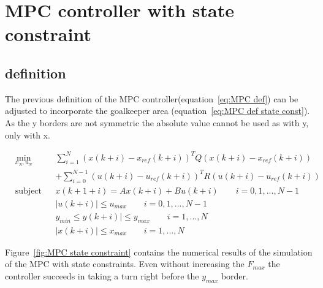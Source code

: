 \section{MPC controller with state constraint}
	\subsection{definition}
	The previous definition of the MPC controller(equation~\ref{eq:MPC def}) can be adjusted to incorporate the goalkeeper area (equation~\ref{eq:MPC def state const}). As the y borders are not symmetric the absolute value cannot be used as with y, only with x.
	
	\begin{equation}
		\begin{aligned}
			& \min_{x_N,u_N}
			& & \sum^{N}_{i=1} 	(x(k+i) - x_{ref}(k+i))^TQ(x(k+i) - x_{ref}(k+i)) \\
			& & & + \sum^{N-1}_{i=0} 	(u(k+i) - u_{ref}(k+i))^TR(u(k+i) - u_{ref}(k+i))\\
			& \text{subject to}
			& & x(k+1+i) = Ax(k+i) +Bu(k+i) \qquad    i=0,1,..., N-1\\
			&&& |u(k+i)| \leq u_{max} \qquad    i=0,1,..., N-1 \\
			&&& y_{min} \leq y(k+i)| \leq y_{max} \qquad    i=1,..., N \\
			&&& |x(k+i)| \leq x_{max} \qquad    i=1,..., N
		\end{aligned}
		\label{eq:MPC def state const}
	\end{equation}
	
	Figure~\ref{fig:MPC state constraint} contains the numerical results of the simulation of the MPC with state constraints. Even without increasing the $F_{max}$ the controller succeeds in taking a turn right before the $y_{max}$ border. 

